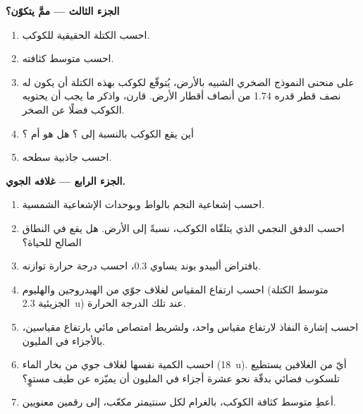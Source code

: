 \begin{problem}
\medskip\noindent\textbf{الجزء الثالث --- ممَّ يتكوّن؟}
\begin{enumerate}[resume]
\item احسب الكتلة الحقيقية للكوكب.
\item احسب متوسط كثافته.
\item على منحنى النموذج الصخري الشبيه بالأرض، يُتوقّع لكوكب بهذه الكتلة
  أن يكون له نصف قطر قدره 1.74 من أنصاف أقطار الأرض. قارن، واذكر ما يجب أن يحتويه
  الكوكب فضلًا عن الصخر.
\item أين يقع الكوكب بالنسبة إلى ؟ هل هو
   أم ؟
\item احسب جاذبية سطحه.
\end{enumerate}

\medskip\noindent\textbf{الجزء الرابع --- غلافه الجوي.}
\begin{enumerate}[resume]
\item احسب إشعاعية النجم بالواط وبوحدات الإشعاعية
  الشمسية.
\item احسب الدفق النجمي الذي يتلقّاه الكوكب، نسبةً إلى
  الأرض. هل يقع في النطاق الصالح للحياة؟
\item بافتراض ألبيدو بوند يساوي 0.3، احسب درجة حرارة توازنه.
\item احسب ارتفاع المقياس لغلاف جوّي من الهيدروجين والهليوم
  (متوسط الكتلة الجزيئية \qty{2.3}{u}) عند تلك الدرجة الحرارة.
\item احسب إشارة النفاذ لارتفاع مقياس واحد، ولشريط
  امتصاص مائي بارتفاع مقياسين، بالأجزاء في المليون.
\item احسب الكمية نفسها لغلاف جوي من بخار الماء (\qty{18}{u}). أيّ من
  الغلافين يستطيع تلسكوب فضائي بدقّة نحو عشرة أجزاء في المليون
  أن يميّزه عن طيف مستوٍ؟
\item أعطِ متوسط كثافة الكوكب، بالغرام لكل سنتيمتر مكعّب، إلى
  رقمين معنويين.
\end{enumerate}
\end{problem}
